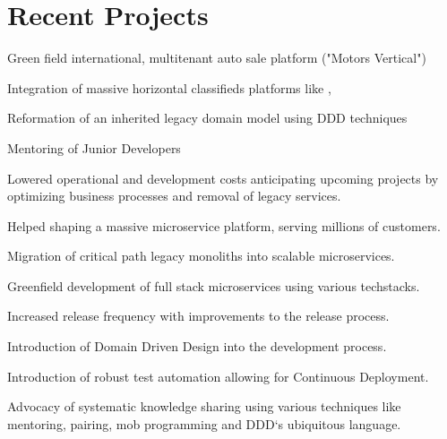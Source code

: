 \documentclass[]{resume}
\begin{document}
\hfill
\begin{minipage}[t]{0.64\textwidth} 


\section{Recent Projects}

\vspace{\topsep} %
\begin{tightemize}
\item Green field international, multitenant auto sale platform ("Motors Vertical")
\item Integration of massive horizontal classifieds platforms like \href{https://www.kijiji.ca}{}, \href{https://www.gumtree.com.au}{}
\item Reformation of an inherited legacy domain model using DDD techniques
\item Mentoring of Junior Developers
\end{tightemize}
\sectionsep

\begin{tightemize}\item Lowered operational and development costs anticipating upcoming projects by optimizing business processes and removal of legacy services.
\end{tightemize}
\sectionsep

\begin{tightemize}
\item Helped shaping a massive microservice platform, serving millions of customers.
\item Migration of critical path legacy monoliths into scalable microservices.
\item Greenfield development of full stack microservices using various techstacks.
\item Increased release frequency with improvements to the release process.
\item Introduction of Domain Driven Design into the development process.
\item Introduction of robust test automation allowing for Continuous Deployment.
\item Advocacy of systematic knowledge sharing using various techniques like mentoring, pairing, mob programming and DDD`s ubiquitous language.
\end{tightemize}
\sectionsep


\end{minipage}
\end{document}
